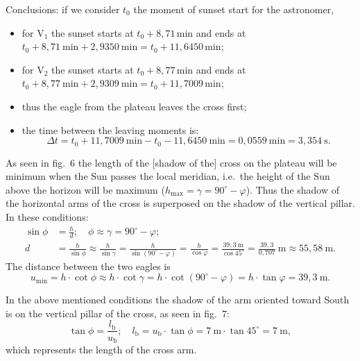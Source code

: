 \begin{description}
  Conclusions: if we consider $t_0$ the moment of sunset start for the
  astronomer,
  \begin{itemize}
  \item for $\mathrm{V}_1$ the sunset starts at $t_0 + 8{,}71$\,min and ends
    at $t_0 + 8{,}71\ \mathrm{min} + 2{,}9350\ \mathrm{min}
    = t_0 + 11{,}6450$\,min;
  \item for $\mathrm{V}_2$ the sunset starts at $t_0 + 8{,}77$\,min and ends
    at $t_0 + 8{,}77\ \mathrm{min} + 2{,}9309\ \mathrm{min}
    = t_0 + 11{,}7009$\,min;
  \item thus the eagle from the plateau leaves the cross first;
  \item the time between the leaving moments is:
    \[ \Delta t = t_0 + 11{,}7009\ \mathrm{min}
       - t_0 - 11{,}6450\ \mathrm{min}
       = 0{,}0559\ \mathrm{min} = 3{,}354\ \mathrm{s}. \]
  \end{itemize}

\item[B.1)] As seen in fig.~6 the length of the [shadow of the] cross on the
  plateau will be minimum when the Sun passes the local meridian, i.e.\ the
  height of the Sun above the horizon will be maximum
  ($h_{\mathrm{max}} = \gamma = 90^\circ - \varphi$). Thus the shadow of the
  horizontal arms of the cross is superposed on the shadow of the vertical
  pillar.
  In these conditions:
  \begin{align*}
  \sin\phi &= \frac{h}{d};\quad
    \phi \approx \gamma = 90^\circ - \varphi;\\
  d &= \frac{h}{\sin\phi} \approx \frac{h}{\sin\gamma}
    = \frac{h}{\sin(90^\circ - \varphi)}
    = \frac{h}{\cos\varphi}
    = \frac{39{,}3\ \mathrm{m}}{\cos 45^\circ}
    = \frac{39{,}3}{0{,}707}\ \mathrm{m} \approx 55{,}58\ \mathrm{m}.
  \end{align*}
  The distance between the two eagles is
  \[ u_{\mathrm{min}} = h\cdot\cot\phi \approx h\cdot\cot\gamma
     = h\cdot\cot(90^\circ - \varphi)
     = h\cdot\tan\varphi = 39{,}3\ \mathrm{m}. \]

\item[B.2)] In the above mentioned conditions the shadow of the arm oriented
  toward South is on the vertical pillar of the cross, as seen in fig.~7:
  \[ \tan\phi = \frac{l_{\mathrm{b}}}{u_{\mathrm{b}}};\quad
     l_{\mathrm{b}} = u_{\mathrm{b}}\cdot\tan\phi
     = 7\ \mathrm{m}\cdot\tan 45^\circ = 7\ \mathrm{m}, \]
  which represents the length of the cross arm.


\end{description}
